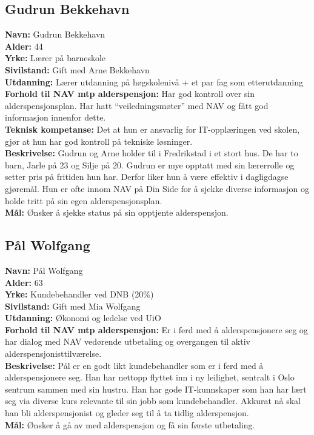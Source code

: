 \documentclass[informationsecurity]{gucmasterproject}
\begin{document}
\subsection{Gudrun Bekkehavn}
\textbf{Navn:} Gudrun Bekkehavn \\
\textbf{Alder:} 44 \\
\textbf{Yrke:} Lærer på barneskole \\
\textbf{Sivilstand:} Gift med Arne Bekkehavn \\
\textbf{Utdanning:} Lærer utdanning på høgskolenivå + et par fag som etterutdanning \\
\textbf{Forhold til NAV mtp alderspensjon:} Har god kontroll over sin alderspensjonsplan. Har hatt “veiledningsmøter” med NAV og fått god informasjon innenfor dette. \\
\textbf{Teknisk kompetanse:} Det at hun er ansvarlig for IT-opplæringen ved skolen, gjør at hun har god kontroll på tekniske løsninger. \\
\textbf{Beskrivelse:} Gudrun og Arne holder til i Fredrikstad i et stort hus. De har to barn, Jarle på 23 og Silje på 20. Gudrun er mye opptatt med sin lærerrolle og setter pris på fritiden hun har. Derfor liker hun å være effektiv i dagligdagse gjøremål. Hun er ofte innom NAV på Din Side for å sjekke diverse informasjon og holde tritt på sin egen alderspensjonsplan. \\
\textbf{Mål:} Ønsker å sjekke status på sin opptjente alderspensjon.


\subsection{Pål Wolfgang}
\textbf{Navn:} Pål Wolfgang \\
\textbf{Alder:} 63 \\
\textbf{Yrke:} Kundebehandler ved DNB (20\%) \\
\textbf{Sivilstand:} Gift med Mia Wolfgang \\
\textbf{Utdanning:} Økonomi og ledelse ved UiO \\
\textbf{Forhold til NAV mtp alderspensjon:} Er i ferd med å alderspensjonere seg og har dialog med NAV vedørende utbetaling og overgangen til aktiv alderspensjonisttilværelse. \\
\textbf{Beskrivelse:} Pål er en godt likt kundebehandler som er i ferd med å alderspensjonere seg. Han har nettopp flyttet inn i ny leilighet, sentralt i Oslo sentrum sammen med sin hustru. Han har gode IT-kunnskaper som han har lært seg via diverse kurs relevante til sin jobb som kundebehandler. Akkurat nå skal han bli alderspensjonist og gleder seg til å ta tidlig alderspensjon. \\
\textbf{Mål:} Ønsker å gå av med alderspensjon og få sin første utbetaling.
\end{document}

